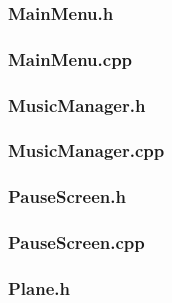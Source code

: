 \documentclass{article}
\begin{document}
\subsubsection{MainMenu.h}
	

\subsubsection{MainMenu.cpp}
		 
 				
\subsubsection{MusicManager.h}
	
	 				
\subsubsection{MusicManager.cpp}
	
	 				
\subsubsection{PauseScreen.h}
	 
	 				
\subsubsection{PauseScreen.cpp}	
	 
	 				
\subsubsection{Plane.h}
	
	 				
\end{document}

